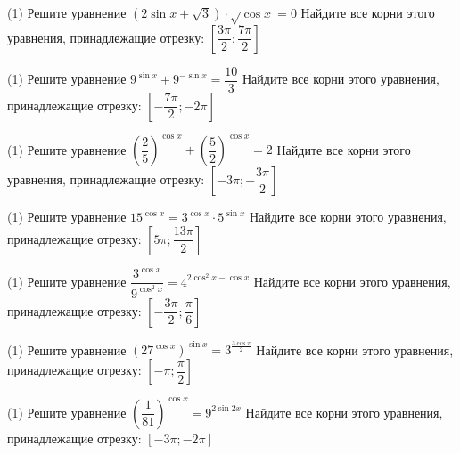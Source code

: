 %
%

\begin{class}[number=1]
	\begin{listofex}
		\item %
		\begin{tasks}(1)
			\task Решите уравнение \( (2\sin x+\sqrt{3}) \cdot \sqrt{\cos x}=0 \)
			\task Найдите все корни этого уравнения, принадлежащие отрезку: \( \left[ \dfrac{3\pi}{2}; \dfrac{7\pi}{2} \right] \)
		\end{tasks}
		\item %
		\begin{tasks}(1)
			\task Решите уравнение \( 9^{\sin{x}}+9^{-\sin x}=\dfrac{10}{3} \)
			\task Найдите все корни этого уравнения, принадлежащие отрезку: \( \left[ -\dfrac{7\pi}{2}; -2\pi \right]  \)
		\end{tasks}
		\item %
		\begin{tasks}(1)
			\task Решите уравнение \( \left( \dfrac{2}{5} \right)^{\cos x}+ \left( \dfrac{5}{2} \right)^{\cos x}=2 \)
			\task Найдите все корни этого уравнения, принадлежащие отрезку: \( \left[ -3\pi;-\dfrac{3\pi}{2} \right]  \)
		\end{tasks}
		\item %
		\begin{tasks}(1)
			\task Решите уравнение \( 15^{\cos x}=3^{\cos x} \cdot 5^{\sin x} \)
			\task Найдите все корни этого уравнения, принадлежащие отрезку: \( \left[ 5\pi; \dfrac{13\pi}{2} \right]  \)
		\end{tasks}
		\item %
		\begin{tasks}(1)
			\task Решите уравнение \( \dfrac{3^{\cos x}}{9^{\cos^2x}}=4^{2\cos^2x-\cos x} \)
			\task Найдите все корни этого уравнения, принадлежащие отрезку: \( \left[ -\dfrac{3\pi}{2}; \dfrac{\pi}{6} \right]  \)
		\end{tasks}
		\item %
		\begin{tasks}(1)
			\task Решите уравнение \( (27^{\cos x})^{\sin x}=3^{\frac{3\cos x}{2}} \)
			\task Найдите все корни этого уравнения, принадлежащие отрезку: \( \left[ -\pi; \dfrac{\pi}{2} \right]  \)
		\end{tasks}
		
		\item %
		\begin{tasks}(1)
			\task Решите уравнение \( \left( \dfrac{1}{81} \right)^{\cos x}=9^{2\sin{2x}} \)
			\task Найдите все корни этого уравнения, принадлежащие отрезку: \( [-3\pi; -2\pi] \)
		\end{tasks}
	\end{listofex}
\end{class}


